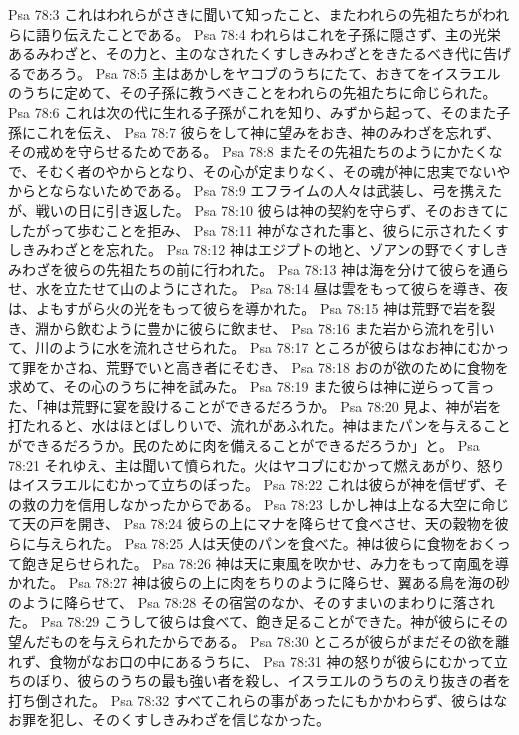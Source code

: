 Psa 78:3  これはわれらがさきに聞いて知ったこと、またわれらの先祖たちがわれらに語り伝えたことである。
Psa 78:4  われらはこれを子孫に隠さず、主の光栄あるみわざと、その力と、主のなされたくすしきみわざとをきたるべき代に告げるであろう。
Psa 78:5  主はあかしをヤコブのうちにたて、おきてをイスラエルのうちに定めて、その子孫に教うべきことをわれらの先祖たちに命じられた。
Psa 78:6  これは次の代に生れる子孫がこれを知り、みずから起って、そのまた子孫にこれを伝え、
Psa 78:7  彼らをして神に望みをおき、神のみわざを忘れず、その戒めを守らせるためである。
Psa 78:8  またその先祖たちのようにかたくなで、そむく者のやからとなり、その心が定まりなく、その魂が神に忠実でないやからとならないためである。
Psa 78:9  エフライムの人々は武装し、弓を携えたが、戦いの日に引き返した。
Psa 78:10  彼らは神の契約を守らず、そのおきてにしたがって歩むことを拒み、
Psa 78:11  神がなされた事と、彼らに示されたくすしきみわざとを忘れた。
Psa 78:12  神はエジプトの地と、ゾアンの野でくすしきみわざを彼らの先祖たちの前に行われた。
Psa 78:13  神は海を分けて彼らを通らせ、水を立たせて山のようにされた。
Psa 78:14  昼は雲をもって彼らを導き、夜は、よもすがら火の光をもって彼らを導かれた。
Psa 78:15  神は荒野で岩を裂き、淵から飲むように豊かに彼らに飲ませ、
Psa 78:16  また岩から流れを引いて、川のように水を流れさせられた。
Psa 78:17  ところが彼らはなお神にむかって罪をかさね、荒野でいと高き者にそむき、
Psa 78:18  おのが欲のために食物を求めて、その心のうちに神を試みた。
Psa 78:19  また彼らは神に逆らって言った、「神は荒野に宴を設けることができるだろうか。
Psa 78:20  見よ、神が岩を打たれると、水はほとばしりいで、流れがあふれた。神はまたパンを与えることができるだろうか。民のために肉を備えることができるだろうか」と。
Psa 78:21  それゆえ、主は聞いて憤られた。火はヤコブにむかって燃えあがり、怒りはイスラエルにむかって立ちのぼった。
Psa 78:22  これは彼らが神を信ぜず、その救の力を信用しなかったからである。
Psa 78:23  しかし神は上なる大空に命じて天の戸を開き、
Psa 78:24  彼らの上にマナを降らせて食べさせ、天の穀物を彼らに与えられた。
Psa 78:25  人は天使のパンを食べた。神は彼らに食物をおくって飽き足らせられた。
Psa 78:26  神は天に東風を吹かせ、み力をもって南風を導かれた。
Psa 78:27  神は彼らの上に肉をちりのように降らせ、翼ある鳥を海の砂のように降らせて、
Psa 78:28  その宿営のなか、そのすまいのまわりに落された。
Psa 78:29  こうして彼らは食べて、飽き足ることができた。神が彼らにその望んだものを与えられたからである。
Psa 78:30  ところが彼らがまだその欲を離れず、食物がなお口の中にあるうちに、
Psa 78:31  神の怒りが彼らにむかって立ちのぼり、彼らのうちの最も強い者を殺し、イスラエルのうちのえり抜きの者を打ち倒された。
Psa 78:32  すべてこれらの事があったにもかかわらず、彼らはなお罪を犯し、そのくすしきみわざを信じなかった。
